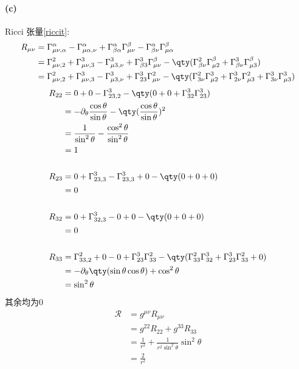 \paragraph{(c)}
Ricci 张量\ref{riccit}:
\begin{align*}
    R_{\mu\nu} &= \Gamma^\alpha_{\mu\nu, \alpha} - \Gamma^\alpha_{\mu\alpha, \nu} + \Gamma^\alpha_{\beta\alpha}\Gamma^\beta_{\mu\nu} - \Gamma^\alpha_{\beta\nu}\Gamma^\beta_{\mu\alpha}\\
    &=\Gamma^2_{\mu\nu,2} + \Gamma^3_{\mu\nu,3} - \Gamma^3_{\mu3, \nu} + \Gamma^3_{\beta 3}\Gamma^\beta_{\mu\nu} - \qty(\Gamma^2_{\beta\nu}\Gamma^\beta_{\mu 2} + \Gamma^3_{\beta\nu}\Gamma^\beta_{\mu 3})\\
    &=\Gamma^2_{\mu\nu,2} + \Gamma^3_{\mu\nu,3} - \Gamma^3_{\mu3, \nu} +\Gamma^3_{2 3}\Gamma^2_{\mu\nu} - \qty(\Gamma^2_{3\nu}\Gamma^3_{\mu 2} + \Gamma^3_{2\nu}\Gamma^2_{\mu 3} + \Gamma^3_{3\nu}\Gamma^3_{\mu 3})\\
\end{align*}
\begin{align*}
    R_{22} &= 0 + 0 - \Gamma^3_{23, 2} - \qty(0 + 0 + \Gamma^3_{32}\Gamma^3_{23})\\
        &=-\partial_\theta\frac{\cos\theta}{\sin\theta} - \qty(\frac{\cos\theta}{\sin\theta})^2\\
        &=\frac{1}{\sin^2\theta}-\frac{\cos^2\theta}{\sin^2\theta} \\
        &=1\\
    \\
    R_{23} &= 0 + \Gamma^3_{23,3}-\Gamma^3_{23,3} + 0 - \qty(0 + 0 + 0)\\
        &= 0\\
    \\
    R_{32} &= 0 + \Gamma^3_{32,3} - 0 + 0 - \qty(0 + 0 + 0)\\
    &=0\\
    \\
    R_{33} &= \Gamma^2_{33,2} + 0 - 0 + \Gamma^3_{23}\Gamma^2_{33} - \qty(\Gamma^2_{33}\Gamma^3_{32}+\Gamma^3_{23}\Gamma^2_{33}+0)\\ 
        & = -\partial_\theta\qty(\sin\theta\cos\theta) + \cos^2\theta \\
        & = \sin^2\theta
\end{align*}
其余均为$0$
\begin{align*}
    \mathcal{R} &= g^{\mu\nu}R_{\mu\nu}\\
        & = g^{22}R_{22} + g^{33}R_{33}\\
        & = \frac{1}{r^2} + \frac{1}{r^2\sin^2\theta}\sin^2\theta\\
        & = \frac{2}{r^2} 
\end{align*}